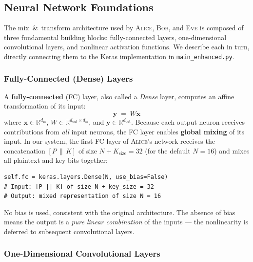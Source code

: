 \documentclass[12pt, a4paper]{article}
\newcommand{\alice}{\textsc{Alice}}
\newcommand{\bob}{\textsc{Bob}}
\newcommand{\eve}{\textsc{Eve}}
\newcommand{\code}[1]{\texttt{\color{CodeRed}#1}}
\begin{document}
\subsection{Neural Network Foundations}
\label{subsec:nn}

The mix~\&~transform architecture used by \alice{}, \bob{}, and \eve{}
is composed of three fundamental building blocks: fully-connected layers,
one-dimensional convolutional layers, and nonlinear activation functions.
We describe each in turn, directly connecting them to the Keras
implementation in \code{main\_enhanced.py}.

\subsubsection*{Fully-Connected (Dense) Layers}

A \textbf{fully-connected} (FC) layer, also called a \emph{Dense} layer,
computes an affine transformation of its input:
%
\begin{equation}
  \mathbf{y} \;=\; W\mathbf{x}
  \label{eq:fc}
\end{equation}
%
where $\mathbf{x} \in \mathbb{R}^{d_{\text{in}}}$,
$W \in \mathbb{R}^{d_{\text{out}} \times d_{\text{in}}}$, and
$\mathbf{y} \in \mathbb{R}^{d_{\text{out}}}$. Because each output neuron
receives contributions from \emph{all} input neurons, the FC layer enables
\textbf{global mixing} of its input. In our system, the first FC layer of
\alice{}'s network receives the concatenation $[P \,\|\, K]$ of size
$N + K_{\text{size}} = 32$ (for the default $N = 16$) and mixes all
plaintext and key bits together:

\begin{lstlisting}[caption={FC layer in \code{CipherNet} — global key-plaintext mixing}]
self.fc = keras.layers.Dense(N, use_bias=False)
# Input: [P || K] of size N + key_size = 32
# Output: mixed representation of size N = 16
\end{lstlisting}

No bias is used, consistent with the original architecture. The absence
of bias means the output is a \emph{pure linear combination} of the
inputs — the nonlinearity is deferred to subsequent convolutional layers.

\subsubsection*{One-Dimensional Convolutional Layers}
\end{document}
